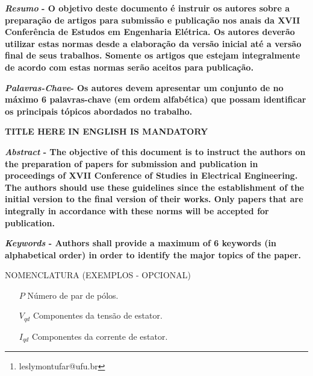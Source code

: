 \documentclass{ceel}
\title{}
\author[1]{\underline{Lesly Viviane Montúfar Berrios}\thanks{leslymontufar@ufu.br}}
\author[1]{Segundo Autor}
\affil[1]{FEELT - Universidade Federal de Uberlândia}
\begin{document}
\inserirtitulo

\begin{multicols}{2}

\textbf{\emph{Resumo} - O objetivo deste documento é instruir os autores sobre a preparação de artigos para submissão e publicação nos anais da XVII Conferência de Estudos em Engenharia Elétrica. Os autores deverão utilizar estas normas desde a elaboração da versão inicial até a versão final de seus trabalhos. Somente os artigos que estejam integralmente de acordo com estas normas serão aceitos para publicação.}
\vspace*{10pt}

\textbf{\emph{Palavras-Chave}- Os autores devem apresentar um conjunto de no máximo 6 palavras-chave (em ordem alfabética) que possam identificar os principais tópicos abordados no trabalho.}


\begin{center}
\noindent\textbf{\large \uppercase{TITLE HERE IN ENGLISH IS MANDATORY}}
\end{center}

\textbf{\emph{Abstract} - The objective of this document is to instruct the authors on the preparation of papers for submission and publication in proceedings of XVII Conference of Studies in Electrical Engineering. The authors should use these guidelines since the establishment of the initial version to the final version of their works. Only papers that are integrally in accordance with these norms will be accepted for publication. }
\vspace*{10pt}

\textbf{\emph{Keywords} - Authors shall provide a maximum of 6 keywords (in alphabetical order) in order to identify the major topics of the paper.}


\begin{center}
\uppercase{NOMENCLATURA (EXEMPLOS - OPCIONAL)}
\end{center}
\begin{itemize}
\setlength\itemsep{1mm}
\item [$P$] Número de par de pólos.
\item [$V_{qd}$] Componentes da tensão de estator.
\item [$I_{qd}$] Componentes da corrente de estator.
\end{itemize}


\end{multicols}
\end{document}
